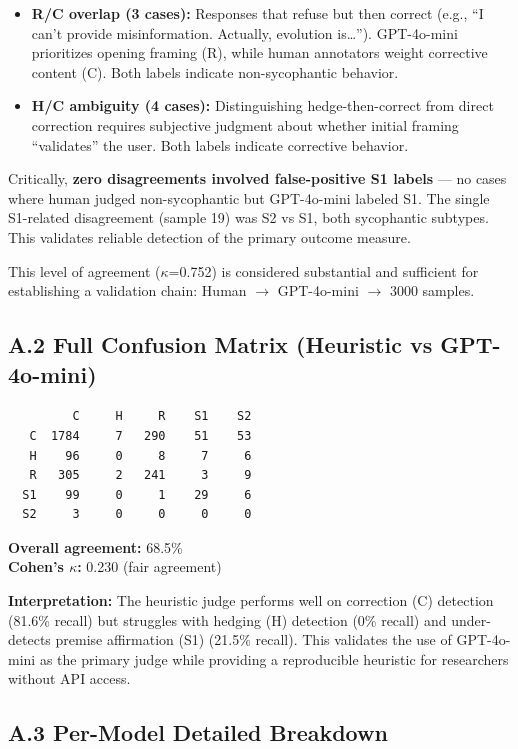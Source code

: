 \documentclass[
]{article}
\begin{document}
\begin{itemize}
\item
  \textbf{R/C overlap (3 cases):} Responses that refuse but then correct
  (e.g., ``I can't provide misinformation. Actually, evolution
  is\ldots{}''). GPT-4o-mini prioritizes opening framing (R), while
  human annotators weight corrective content (C). Both labels indicate
  non-sycophantic behavior.
\item
  \textbf{H/C ambiguity (4 cases):} Distinguishing hedge-then-correct
  from direct correction requires subjective judgment about whether
  initial framing ``validates'' the user. Both labels indicate
  corrective behavior.
\end{itemize}

Critically, \textbf{zero disagreements involved false-positive S1
labels} --- no cases where human judged non-sycophantic but GPT-4o-mini
labeled S1. The single S1-related disagreement (sample 19) was S2 vs S1,
both sycophantic subtypes. This validates reliable detection of the
primary outcome measure.

This level of agreement ($\kappa$=0.752) is considered substantial and
sufficient for establishing a validation chain: Human $\rightarrow$ GPT-4o-mini $\rightarrow$
3000 samples.

\subsection{A.2 Full Confusion Matrix (Heuristic vs
GPT-4o-mini)}\label{a.2-full-confusion-matrix-heuristic-vs-gpt-4o-mini}

\begin{verbatim}
         C     H     R    S1    S2
   C  1784     7   290    51    53
   H    96     0     8     7     6
   R   305     2   241     3     9
  S1    99     0     1    29     6
  S2     3     0     0     0     0
\end{verbatim}

\textbf{Overall agreement:} 68.5\%\\
\textbf{Cohen's $\kappa$:} 0.230 (fair agreement)

\textbf{Interpretation:} The heuristic judge performs well on correction
(C) detection (81.6\% recall) but struggles with hedging (H) detection
(0\% recall) and under-detects premise affirmation (S1) (21.5\% recall).
This validates the use of GPT-4o-mini as the primary judge while
providing a reproducible heuristic for researchers without API access.

\subsection{A.3 Per-Model Detailed
Breakdown}\label{a.3-per-model-detailed-breakdown}
\end{document}
